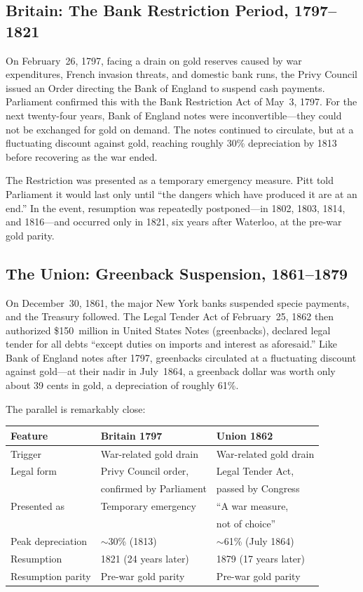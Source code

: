 \documentclass[12pt]{article}
\begin{document}
\subsection{Britain: The Bank Restriction Period, 1797--1821}

On February~26, 1797, facing a drain on gold reserves caused by war
expenditures, French invasion threats, and domestic bank runs, the Privy
Council issued an Order directing the Bank of England to suspend cash
payments. Parliament confirmed this with the Bank Restriction Act of
May~3, 1797. For the next twenty-four years, Bank of England notes were
inconvertible---they could not be exchanged for gold on demand. The notes
continued to circulate, but at a fluctuating discount against gold,
reaching roughly 30\% depreciation by 1813 before recovering as the war
ended.

The Restriction was presented as a temporary emergency measure. Pitt
told Parliament it would last only until ``the dangers which have
produced it are at an end.'' In the event, resumption was repeatedly
postponed---in 1802, 1803, 1814, and 1816---and occurred only in 1821,
six years after Waterloo, at the pre-war gold parity.

\subsection{The Union: Greenback Suspension, 1861--1879}

On December~30, 1861, the major New York banks suspended specie
payments, and the Treasury followed. The Legal Tender Act of
February~25, 1862 then authorized \$150~million in United States Notes
(greenbacks), declared legal tender for all debts ``except duties on
imports and interest as aforesaid.'' Like Bank of England notes after
1797, greenbacks circulated at a fluctuating discount against gold---at
their nadir in July~1864, a greenback dollar was worth only about 39
cents in gold, a depreciation of roughly 61\%.

The parallel is remarkably close:

\begin{center}
\begin{tabular}{lll}
\toprule
\textbf{Feature} & \textbf{Britain 1797} & \textbf{Union 1862} \\
\midrule
Trigger & War-related gold drain & War-related gold drain \\
Legal form & Privy Council order, & Legal Tender Act, \\
 & confirmed by Parliament & passed by Congress \\
Presented as & Temporary emergency & ``A war measure, \\
 & & not of choice'' \\
Peak depreciation & $\sim$30\% (1813) & $\sim$61\% (July 1864) \\
Resumption & 1821 (24 years later) & 1879 (17 years later) \\
Resumption parity & Pre-war gold parity & Pre-war gold parity \\
\bottomrule
\end{tabular}
\end{center}
\end{document}
